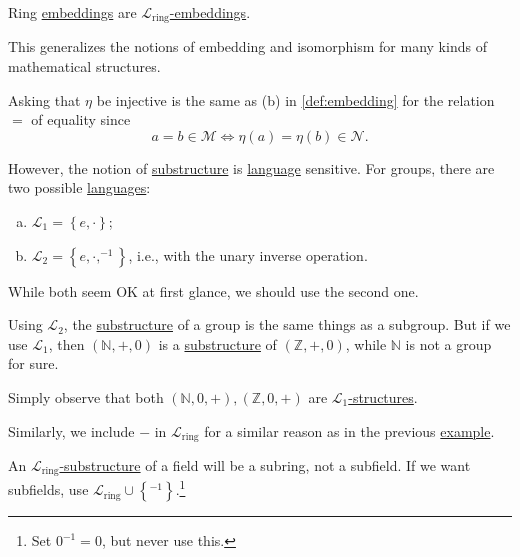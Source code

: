 \begin{eg}
	Ring \hyperref[def:embedding]{embeddings} are \hyperref[def:embedding]{\(\mathcal{L} _{\text{ring} }\)-embeddings}.
\end{eg}

This generalizes the notions of embedding and isomorphism for many kinds of mathematical structures.

\begin{remark}
	Asking that \(\eta \) be injective is the same as (b) in \autoref{def:embedding} for the relation \(=\) of equality since
	\[
		a=b \in \mathcal{M} \iff \eta (a) = \eta (b) \in \mathcal{N} .
	\]
\end{remark}

However, the notion of \hyperref[def:substructure]{substructure} is \hyperref[def:language]{language} sensitive. For groups, there are two possible \hyperref[def:language]{languages}:
\begin{enumerate}[(a)]
	\item \(\mathcal{L} _1 = \left\{ e, \cdot \right\} \);
	\item \(\mathcal{L} _2 = \left\{ e, \cdot, ^{-1} \right\} \), i.e., with the unary inverse operation.
\end{enumerate}
While both seem OK at first glance, we should use the second one.

\begin{remark}
	Using \(\mathcal{L} _2\), the \hyperref[def:substructure]{substructure} of a group is the same things as a subgroup. But if we use \(\mathcal{L} _1\), then \((\mathbb{N}, +, 0)\) is a \hyperref[def:substructure]{substructure} of \((\mathbb{Z} , +, 0)\), while \(\mathbb{N} \) is not a group for sure.
\end{remark}
\begin{explanation}
	Simply observe that both \((\mathbb{N} , 0, +), (\mathbb{Z} , 0, +)\) are \hyperref[def:structure]{\(\mathcal{L} _1\)-structures}.
\end{explanation}

Similarly, we include \(-\) in \(\mathcal{L} _{\text{ring}}\) for a similar reason as in the previous \hyperref[eg:language-ring]{example}.

\begin{eg}
	An \hyperref[def:substructure]{\(\mathcal{L} _{\text{ring} }\)-substructure} of a field will be a subring, not a subfield. If we want subfields, use \(\mathcal{L} _{\text{ring} } \cup \left\{ ^{-1} \right\} \).\footnote{Set \(0^{-1} = 0\), but never use this.}
\end{eg}